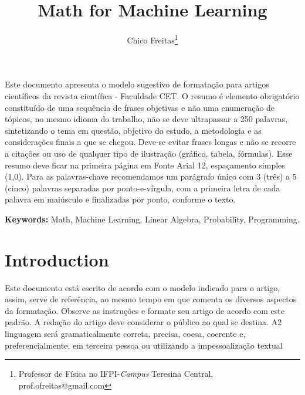 \documentclass[12pt]{article}
\title{Math for Machine Learning}
\author{Chico Freitas\footnote{Professor de Física no IFPI-\textit{Campus} Teresina Central, prof.ofreitas@gmail.com}}
\renewenvironment{abstract}
{\small
	\begin{center}
		\bfseries \abstractname\vspace{-.5em}\vspace{0pt}
	\end{center}
	\list{}{
		\setlength{\leftmargin}{.0cm}%
		\setlength{\rightmargin}{\leftmargin}%
	}%
	\item\relax}
{\endlist}
\begin{document}
{\selectfont
	\begin{spacing}{1.5}
	\maketitle
	
	\begin{abstract}
		\begin{singlespace}
			\noindent
		
				Este documento apresenta o modelo sugestivo de formatação para artigos
			científicos da revista científica - Faculdade CET. O resumo é elemento obrigatório
			constituído de uma sequência de frases objetivas e não uma enumeração de
			tópicos, no mesmo idioma do trabalho, não se deve ultrapassar a 250 palavras,
			sintetizando o tema em questão, objetivo do estudo, a metodologia e as
			considerações finais a que se chegou. Deve-se evitar frases longas e não se recorre
			a citações ou uso de qualquer tipo de ilustração (gráfico, tabela, fórmulas). Esse
			resumo deve ficar na primeira página em Fonte Arial 12, espaçamento simples (1,0).
			Para as palavras-chave recomendamos um parágrafo único com 3 (três) a 5 (cinco)
			palavras separadas por ponto-e-vírgula, com a primeira letra de cada palavra em
			maiúsculo e finalizadas por ponto, conforme o texto.
		\end{singlespace}

		\textbf{Keywords:} Math, Machine Learning, Linear Algebra, Probability, Programming.
	
	\end{abstract}
	
	\section*{ \selectfont Introduction}
			Este documento está escrito de acordo com o modelo indicado para o artigo,
			assim, serve de referência, ao mesmo tempo em que comenta os diversos aspectos
			da formatação. Observe as instruções e formate seu artigo de acordo com este
			padrão. A redação do artigo deve considerar o público ao qual se destina. A2
			linguagem
			será
			gramaticalmente
			correta,
			precisa,
			coesa,
			coerente
			e,
			preferencialmente, em terceira pessoa ou utilizando a impessoalização textual\par
			

\end{spacing}}
\end{document}

